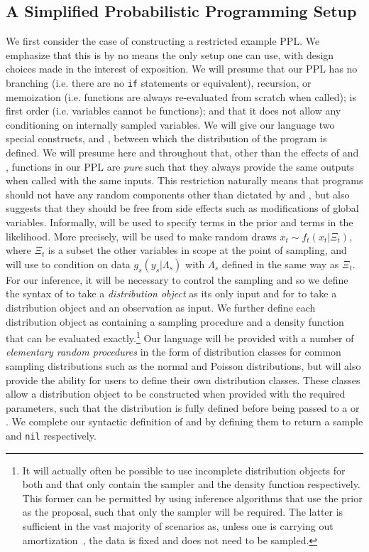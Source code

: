 \subsection{A Simplified Probabilistic Programming Setup}
\label{sec:probprog:models:first}

We first consider the case of constructing a restricted example PPL.  We emphasize that
this is by no means the only setup one can use, with design choices made in the interest of exposition.
We will presume that our PPL
has no branching (i.e. there are no \texttt{if} statements or equivalent), recursion, or memoization
(i.e. functions are always re-evaluated from scratch when called); is first order
(i.e. variables cannot be functions); and that it does not allow 
any conditioning on internally sampled variables.  
We will give our language
two special constructs, \sample and \observe, between which the distribution of the
program is defined.  We will presume here and throughout that, other than the effects of \sample and \observe,
functions in our PPL are \emph{pure} such that they always provide the same outputs when
called with the same inputs.  This restriction naturally means that programs should not have
any random components other than dictated by \sample and \observe, but also suggests that
they should be free from side effects such as modifications of global variables.
Informally, \sample will be used to specify terms in the prior and \observe terms in the
likelihood.  More precisely, \sample will be used to make random draws $x_t \sim f_t(x_t | \Xi_t)$,
where $\Xi_t$ is a subset the other variables in scope at the point of sampling, and \observe will use to condition on
data $g_s(y_s|\Lambda_s)$ with $\Lambda_s$ defined in the same way as $\Xi_t$.  
For our inference, it will be necessary to control the sampling and so we define
the syntax of \sample to take a \emph{distribution object} as its only input and for \observe
to take a distribution object and an observation as input.  We further define each distribution
object as containing a sampling procedure and a density function that can be evaluated
exactly.\footnote{It will actually often be possible to use incomplete distribution objects for
	both \sample and \observe that only contain the sampler and the density function respectively.
	This former can be permitted by using inference algorithms that use the prior as the proposal, such
	that only the sampler will be required.  The latter is sufficient in the vast majority of scenarios as, unless
	one is carrying out amortization~\citep{paige2016inference,le2017inference}, the data is fixed and does
	not need to be sampled.}  Our language will be provided with a number of \emph{elementary random
	procedures} in
the form of distribution classes for common sampling distributions such as the normal and Poisson
distributions, but will also provide the ability for users to define their own distribution classes.   These
classes allow a distribution object to be constructed when provided with the required parameters, such that
the distribution is fully defined before being passed to a \sample or \observe.
We complete our syntactic definition of \sample and \observe by defining them to return a sample and \texttt{nil}
respectively.

